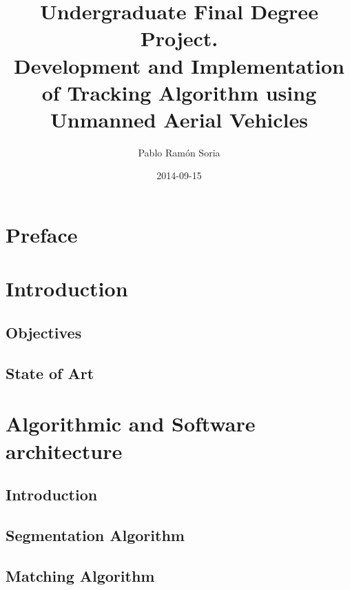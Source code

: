 \documentclass[11pt, oneside]{book} %
\begin{document}
\frontmatter
\title{Undergraduate Final Degree Project. \\ Development and Implementation of Tracking Algorithm using Unmanned Aerial Vehicles}
\author{Pablo Ram\'on Soria}
\date{2014-09-15}
\maketitle

\tableofcontents

\chapter{Preface}


\chapter{Introduction}
\section{Objectives}


\section{State of Art}

\mainmatter

\chapter{Algorithmic and Software architecture}
\section{Introduction}


\section{Segmentation Algorithm}


\section{Matching Algorithm}

\end{document}
